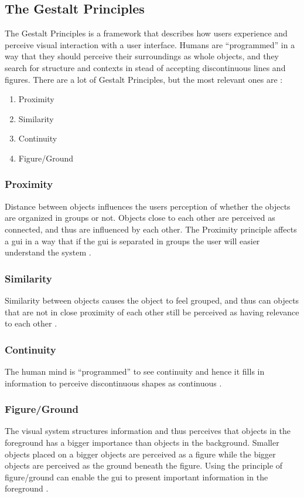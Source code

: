 \subsection{The Gestalt Principles}
\label{sec:gestaltprinciples}
The Gestalt Principles is a framework that describes how users experience and perceive visual interaction with a user interface. Humans are ``programmed'' in a way that they should perceive their surroundings as whole objects, and they search for structure and contexts in stead of accepting discontinuous lines and figures. There are a lot of Gestalt Principles, but the most relevant ones are \cite{johnson}:
\begin{enumerate}
     \item Proximity
     \item Similarity
     \item Continuity
     \item Figure/Ground
 \end{enumerate}

\subsubsection{Proximity}
\label{sec:proximity}
Distance between objects influences the users perception of whether the objects are organized in groups or not. Objects close to each other are perceived as connected, and thus are influenced by each other. The Proximity principle affects a \acrfull{gui} in a way that if the \acrshort{gui} is separated in groups the user will easier understand the system \cite{johnson}.

\subsubsection{Similarity}
\label{sec:similarity}
Similarity between objects causes the object to feel grouped, and thus can objects that are not in close proximity of each other still be perceived as having relevance to each other \cite{johnson}.

\subsubsection{Continuity}
\label{sec:continuity}
The human mind is ``programmed'' to see continuity and hence it fills in information to perceive discontinuous shapes as continuous \cite{johnson}.

\subsubsection{Figure/Ground}
\label{sec:figureground}
The visual system structures information and thus perceives that objects in the foreground has a bigger importance than objects in the background. Smaller objects placed on a bigger objects are perceived as a figure while the bigger objects are perceived as the ground beneath the figure. Using the principle of figure/ground can enable the \acrshort{gui} to present important information in the foreground \cite{johnson}.